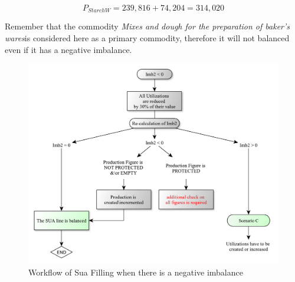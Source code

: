 \documentclass[]{article}
\begin{document}
\begin{equation}
\label{prod}
P_{StarchW} = 239,816 + 74,204 = 314,020
\end{equation}

Remember that the commodity \emph{Mixes and dough for the preparation of
baker's wares}is considered here as a primary commodity, therefore it
will not balanced even if it has a negative imbalance.

\begin{figure}

{\centering \includegraphics{images/06_NegativeImbalance} 

}

\caption{\label{fig:f5}Workflow of Sua Filling when there is a negative imbalance}\label{fig:f6}
\end{figure}
\end{document}
